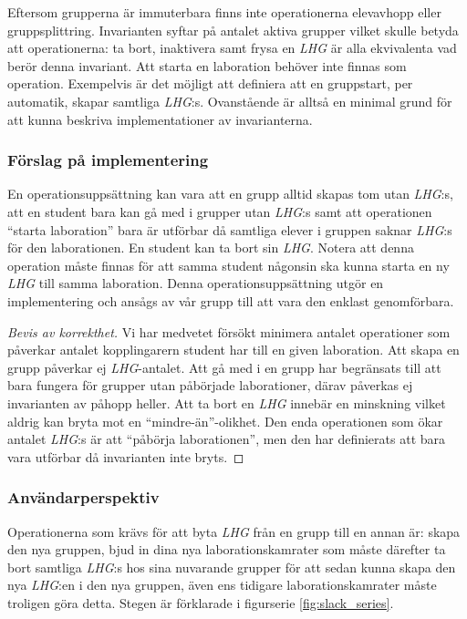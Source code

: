 Eftersom grupperna är immuterbara finns inte operationerna elevavhopp eller gruppsplittring. Invarianten syftar på antalet aktiva grupper vilket skulle betyda att operationerna: ta bort, inaktivera samt frysa en \emph{LHG} är alla ekvivalenta vad berör denna invariant.  Att starta en laboration behöver inte finnas som operation. Exempelvis är det möjligt att definiera att en gruppstart, per automatik, skapar samtliga \emph{LHG}:s. Ovanstående är alltså en minimal grund för att kunna beskriva implementationer av invarianterna.

\subsubsection{Förslag på implementering}
En operationsuppsättning kan vara att en grupp alltid skapas tom utan \emph{LHG}:s, att en student bara kan gå med i grupper utan \emph{LHG}:s samt att operationen “starta laboration” bara är utförbar då samtliga elever i gruppen saknar \emph{LHG}:s för den laborationen. En student kan ta bort sin \emph{LHG}. Notera att denna operation måste finnas för att samma student någonsin ska kunna starta en ny \emph{LHG} till samma laboration. Denna operationsuppsättning utgör en implementering och ansågs av vår grupp till att vara den enklast genomförbara.


\begin{proof}[Bevis av korrekthet]
  Vi har medvetet försökt minimera antalet operationer som påverkar antalet kopplingarern student har till en given laboration. Att skapa en grupp påverkar ej \emph{LHG}-antalet. Att gå med i en grupp har begränsats till att bara fungera för grupper utan påbörjade laborationer, därav påverkas ej invarianten av påhopp heller. Att ta bort en \emph{LHG} innebär en minskning vilket aldrig kan bryta mot en “mindre-än”-olikhet. Den enda operationen som ökar antalet \emph{LHG}:s är att “påbörja laborationen”, men den har definierats att bara vara utförbar då invarianten inte bryts. \qedhere
\end{proof}

\subsubsection{Användarperspektiv}
Operationerna som krävs för att byta \emph{LHG} från en grupp till en annan är: skapa den nya gruppen, bjud in dina nya laborationskamrater som måste därefter ta bort samtliga \emph{LHG}:s hos sina nuvarande grupper för att sedan kunna skapa den nya \emph{LHG}:en i den nya gruppen, även ens tidigare laborationskamrater måste troligen göra detta. Stegen är förklarade i  figurserie \ref{fig:slack_series}.

